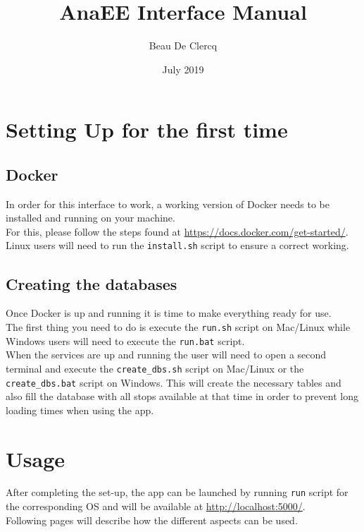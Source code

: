 \documentclass[12pt]{article}
\title{AnaEE Interface Manual}
\author{Beau De Clercq}
\date{July 2019}
\begin{document}
\maketitle{}

\tableofcontents

\clearpage
\newpage

\section{Setting Up for the first time}
\subsection{Docker}
In order for this interface to work, a working version of Docker needs to be installed and running on your machine.\\
For this, please follow the steps found at \url{https://docs.docker.com/get-started/}.\\
Linux users will need to run the \texttt{install.sh} script to ensure a correct working.

\subsection{Creating the databases}
Once Docker is up and running it is time to make everything ready for use.\\
The first thing you need to do is execute the \texttt{run.sh} script on Mac/Linux while Windows users will need to execute the \texttt{run.bat} script.\\
When the services are up and running the user will need to open a second terminal and execute the \texttt{create\_dbs.sh} script on Mac/Linux or the \texttt{create\_dbs.bat} script on Windows. This  will create the necessary tables and also fill the database with all stops available at that time in order to prevent long loading times when using the app.
\newpage

\section{Usage}
After completing the set-up, the app can be launched by running \texttt{run} script for the corresponding OS and will be available at \url{http://localhost:5000/}.\\
Following pages will describe how the different aspects can be used.
\newpage
\end{document}
